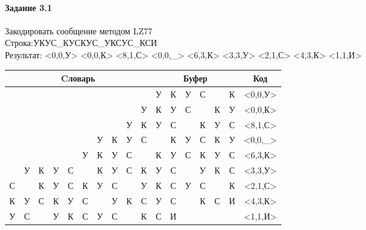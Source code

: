 \documentclass[a4paper, 12pt]{article}
\begin{document}
\paragraph{Задание 3.1}

Закодировать сообщение методом LZ77\\
Строка:УКУС\_КУСКУС\_УКСУС\_КСИ\\
Результат: <0,0,У> <0,0,К> <8,1,С> <0,0,\_> <6,3,К> <3,3,У> <2,1,С> <4,3,К> <1,1,И>\\
\begin{table}[h!]
\centering
\begin{tabular}{|c|c|c|c|c|c|c|c|c|c|c|c|c|c|c|c|c|} 
\hline
\multicolumn{10}{|c|}{Cловарь} & \multicolumn{6}{c|}{Буфер} & Код  \\ \hline
  &   &   &   &   &   &   &   &   &   & \cellcolor[HTML]{8CE4F6} У & К & У & С &   & К & <0,0,У>
\\ \hline
  &   &   &   &   &   &   &   &   & У & \cellcolor[HTML]{8CE4F6} К & У & С &   & К & У & <0,0,К>
\\ \hline
  &   &   &   &   &   &   &   & \cellcolor[HTML]{FFFF00} У & К & \cellcolor[HTML]{FFFF00} У & \cellcolor[HTML]{8CE4F6} С &   & К & У & С & <8,1,С>
\\ \hline
  &   &   &   &   &   & У & К & У & С & \cellcolor[HTML]{8CE4F6}   & К & У & С & К & У & <0,0,\_>
\\ \hline
  &   &   &   &   & У & \cellcolor[HTML]{FFFF00} К & \cellcolor[HTML]{FFFF00} У & \cellcolor[HTML]{FFFF00} С &   & \cellcolor[HTML]{FFFF00} К & \cellcolor[HTML]{FFFF00} У & \cellcolor[HTML]{FFFF00} С & \cellcolor[HTML]{8CE4F6} К & У & С & <6,3,К>
\\ \hline
  & У & К & \cellcolor[HTML]{FFFF00} У & \cellcolor[HTML]{FFFF00} С & \cellcolor[HTML]{FFFF00}   & К & У & С & К & \cellcolor[HTML]{FFFF00} У & \cellcolor[HTML]{FFFF00} С & \cellcolor[HTML]{FFFF00}   & \cellcolor[HTML]{8CE4F6} У & К & С & <3,3,У>
\\ \hline
С &   & \cellcolor[HTML]{FFFF00} К & У & С & К & У & С &   & У & \cellcolor[HTML]{FFFF00} К & \cellcolor[HTML]{8CE4F6} С & У & С &   & К & <2,1,С>
\\ \hline
К & У & С & К & \cellcolor[HTML]{FFFF00} У & \cellcolor[HTML]{FFFF00} С & \cellcolor[HTML]{FFFF00}   & У & К & С & \cellcolor[HTML]{FFFF00} У & \cellcolor[HTML]{FFFF00} С & \cellcolor[HTML]{FFFF00}   & \cellcolor[HTML]{8CE4F6} К & С & И & <4,3,К>
\\ \hline
У & \cellcolor[HTML]{FFFF00} С &   & У & К & С & У & С &   & К & \cellcolor[HTML]{FFFF00} С & \cellcolor[HTML]{8CE4F6} И &   &   &   &   & <1,1,И>
\\ \hline
\end{tabular}
\end{table}
\end{document}
